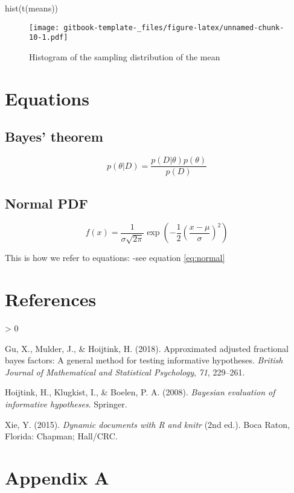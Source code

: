 \documentclass[
]{book}
\newenvironment{Shaded}{\begin{snugshade}}{\end{snugshade}}
\newcommand{\FunctionTok}[1]{\textcolor[rgb]{0.00,0.00,0.00}{#1}}
\newcommand{\NormalTok}[1]{#1}
\newlength{\cslhangindent}
\newenvironment{CSLReferences}[2] %
 {%
  \setlength{\parindent}{0pt}
  \ifodd #1 \everypar{\setlength{\hangindent}{\cslhangindent}}\ignorespaces\fi
  \ifnum #2 > 0
  \setlength{\parskip}{#2\baselineskip}
  \fi
 }%
 {}
\begin{document}
\begin{Shaded}
\begin{Highlighting}[]
\FunctionTok{hist}\NormalTok{(}\FunctionTok{t}\NormalTok{(means))}
\end{Highlighting}
\end{Shaded}

\begin{figure}
\centering
\texttt{[image: gitbook-template-\_files/figure-latex/unnamed-chunk-10-1.pdf]}
\caption{\label{fig:unnamed-chunk-10}Histogram of the sampling distribution of the mean}
\end{figure}

\hypertarget{equations}{%
\chapter{Equations}\label{equations}}

\hypertarget{bayes-theorem}{%
\section{Bayes' theorem}\label{bayes-theorem}}

\begin{equation} 
p(\theta | D) = \frac{p(D|\theta) p(\theta)} {p(D)}
\label{eq:bayes}
\end{equation}

\hypertarget{normal-pdf}{%
\section{Normal PDF}\label{normal-pdf}}

\begin{equation} 
f(x) = \frac{1}{\sigma\sqrt{2\pi}}\exp\left(-\frac{1}{2}\left(\frac{x-\mu}{\sigma}\right)^{2}\right)
\label{eq:normal}
\end{equation}

This is how we refer to equations:
-see equation \eqref{eq:normal}

\hypertarget{references}{%
\chapter*{References}\label{references}}

\hypertarget{refs}{}
\begin{CSLReferences}{1}{0}
\leavevmode\hypertarget{ref-gu2018approximated}{}%
Gu, X., Mulder, J., \& Hoijtink, H. (2018). Approximated adjusted fractional bayes factors: A general method for testing informative hypotheses. \emph{British Journal of Mathematical and Statistical Psychology}, \emph{71}, 229--261.

\leavevmode\hypertarget{ref-hoijtink2008bayesian}{}%
Hoijtink, H., Klugkist, I., \& Boelen, P. A. (2008). \emph{Bayesian evaluation of informative hypotheses}. Springer.

\leavevmode\hypertarget{ref-xie2015}{}%
Xie, Y. (2015). \emph{Dynamic documents with {R} and knitr} (2nd ed.). Boca Raton, Florida: Chapman; Hall/CRC.

\end{CSLReferences}

\hypertarget{appendix-appendix}{%
\appendix}


\hypertarget{appendix-a}{%
\chapter*{Appendix A}\label{appendix-a}}
\end{document}
